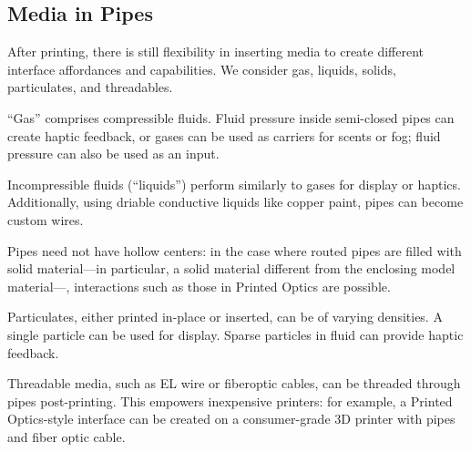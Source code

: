 \subsection{Media in Pipes}
After printing, there is still flexibility in inserting media to create different interface affordances and capabilities. We consider gas, liquids, solids, particulates, and threadables.

``Gas'' comprises compressible fluids.  Fluid pressure inside semi-closed pipes can create haptic feedback, or gases can be used as carriers for scents or fog; fluid pressure can also be used as an input.

Incompressible fluids (``liquids'') perform similarly to gases for display or haptics.  Additionally, using driable conductive liquids like copper paint, pipes can become custom wires.

Pipes need not have hollow centers: in the case where routed pipes are filled with solid material---in particular, a solid material different from the enclosing model material---, interactions such as those in Printed Optics \cite{Willis-printedoptics} are possible.

Particulates, either printed in-place or inserted, can be of varying densities.  A single particle can be used for display.  Sparse particles in fluid can provide haptic feedback.

Threadable media, such as EL wire or fiberoptic cables, can be threaded through pipes post-printing.  This empowers inexpensive printers: for example, a Printed Optics-style interface can be created on a consumer-grade 3D printer with pipes and fiber optic cable.